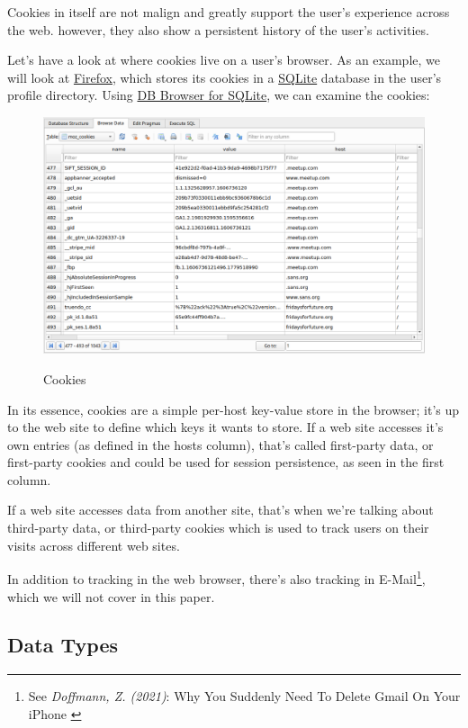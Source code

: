 Cookies in itself are not malign and greatly support the user's experience across the web. however, they also show a persistent history of the user's activities.

Let's have a look at where cookies live on a user's browser. As an example, we will look at \href{https://www.mozilla.org/en-US/firefox/new/}{Firefox}, which stores its cookies in a \href{https://www.sqlite.org/index.html}{SQLite} database in the user's profile directory. Using \href{https://sqlitebrowser.org/}{DB Browser for SQLite}, we can examine the cookies:

\begin{figure}[H]
\centering
\caption {Cookies}
\includegraphics[width=\linewidth]{images/cookie-sqlite.png}
\label{fig:cookies}
\end{figure}

In its essence, cookies are a simple per-host key-value store in the browser; it's up to the web site to define which keys it wants to store. If a web site accesses it's own entries (as defined in the hosts column), that's called first-party data, or first-party cookies and could be used for session persistence, as seen in the first column.

If a web site accesses data from another site, that's when we're talking about third-party data, or third-party cookies which is used to track users on their visits across different web sites.

In addition to tracking in the web browser, there's also tracking in E-Mail\footnote{See \textit{Doffmann, Z. (2021)}: Why You Suddenly Need To Delete Gmail On Your iPhone \cite{deleteGmail}}, which we will not cover in this paper.

\subsection{Data Types}


